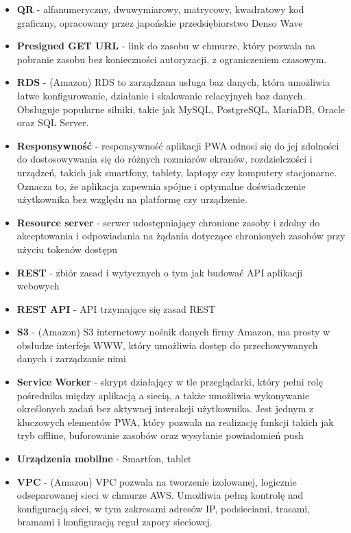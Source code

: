\documentclass[../main.tex]{subfiles}
\begin{document}
\begin{itemize}
        \item \textbf{QR} - alfanumeryczny, dwuwymiarowy, matrycowy, kwadratowy kod graficzny, opracowany przez japońskie przedsiębiorstwo Denso Wave
        \item \textbf{Presigned GET URL} - link do zasobu w chmurze, który pozwala na pobranie zasobu bez konieczności autoryzacji, z ograniczeniem czasowym.
        \item \textbf{RDS} - (Amazon) RDS to zarządzana usługa baz danych, która umożliwia łatwe konfigurowanie, działanie i skalowanie relacyjnych baz danych. Obsługuje popularne silniki, takie jak MySQL, PostgreSQL, MariaDB, Oracle oraz SQL Server.
        \item \textbf{Responsywność} - responsywność aplikacji PWA odnosi się do jej zdolności do dostosowywania się do różnych rozmiarów ekranów, rozdzielczości i urządzeń, takich jak smartfony, tablety, laptopy czy komputery stacjonarne. Oznacza to, że aplikacja zapewnia spójne i optymalne doświadczenie użytkownika bez względu na platformę czy urządzenie.
        \item \textbf{Resource server} - serwer udostępniający chronione zasoby i zdolny do akceptowania i odpowiadania na żądania dotyczące chronionych zasobów przy użyciu tokenów dostępu
        \item \textbf{REST} - zbiór zasad i wytycznych o tym jak budować API aplikacji webowych
        \item \textbf{REST API} - API trzymające się zasad REST
        \item \textbf{S3} - (Amazon) S3 internetowy nośnik danych firmy Amazon, ma prosty w obsłudze interfejs WWW, który umożliwia dostęp do przechowywanych danych i zarządzanie nimi
        \item \textbf{Service Worker} - skrypt działający w tle przeglądarki, który pełni rolę pośrednika między aplikacją a siecią, a także umożliwia wykonywanie określonych zadań bez aktywnej interakcji użytkownika. Jest jednym z kluczowych elementów PWA, który pozwala na realizację funkcji takich jak tryb offline, buforowanie zasobów oraz wysyłanie powiadomień push
        \item \textbf{Urządzenia mobilne} - Smartfon, tablet
        \item \textbf{VPC} - (Amazon) VPC pozwala na tworzenie izolowanej, logicznie odseparowanej sieci w chmurze AWS. Umożliwia pełną kontrolę nad konfiguracją sieci, w tym zakresami adresów IP, podsieciami, trasami, bramami i konfiguracją reguł zapory sieciowej.
    \end{itemize}
\end{document}

